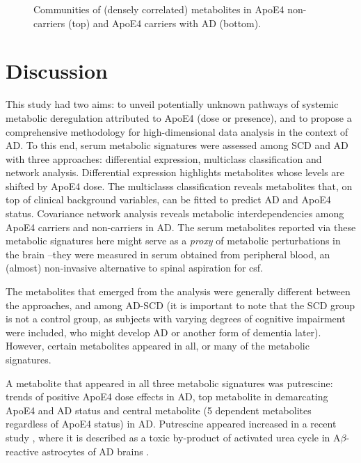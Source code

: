 \documentclass{amsart}
\begin{document}
\begin{figure}
  
  \caption{\label{comms} Communities of (densely correlated) metabolites in ApoE4 non-carriers (top) and ApoE4 carriers with AD (bottom).}
\end{figure}

\clearpage
\section{Discussion} \label{discuss}
This study had two aims: to unveil potentially unknown pathways of systemic metabolic deregulation attributed to ApoE4 (dose or presence), and to propose a comprehensive methodology for high-dimensional data analysis in the context of AD. To this end, serum metabolic signatures were assessed among SCD and AD with three approaches: differential expression, multiclass classification and network analysis. Differential expression highlights metabolites whose levels are shifted by ApoE4 dose. The multiclasss classification reveals metabolites that, on top of clinical background variables, can be fitted to predict AD and ApoE4 status. Covariance network analysis reveals metabolic interdependencies among ApoE4 carriers and non-carriers in AD. The serum metabolites reported via these metabolic signatures here might serve as a \textit{proxy} of metabolic perturbations in the brain --they were measured in serum obtained from peripheral blood, an (almost) non-invasive alternative to spinal aspiration for \acrshort{csf}.

The metabolites that emerged from the analysis were generally different between the approaches, and among AD-SCD (it is important to note that the SCD group is not a control group, as subjects with varying degrees of cognitive impairment were included, who might develop AD or another form of dementia later). However, certain metabolites appeared in all, or many of the metabolic signatures. 

A metabolite that appeared in all three metabolic signatures was putrescine: trends of positive ApoE4 dose effects in AD, top metabolite in demarcating ApoE4 and AD status and central metabolite (5 dependent metabolites regardless of ApoE4 status) in AD. Putrescine appeared increased in a recent study \cite{Ju2021AstrocyticUC}, where it is described as a toxic by-product of activated urea cycle in A$\beta$-reactive astrocytes of AD brains \cite*{Ju2021AstrocyticUC,Wong2022PathogenicP}.
\end{document}
